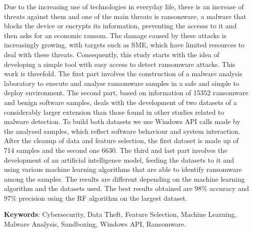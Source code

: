 \noindent Due to the increasing use of technologies in everyday life, there is an increase of threats against them and one of the main threats is ransomware, a malware that blocks the device or encrypts its information, preventing the accesss to it and then asks for an economic ransom. The damage caused by these attacks is increasingly growing, with targets such as \gls{SME}, which have limited resources to deal with these threats. Consequently, this study starts with the idea of developing a simple tool with easy access to detect ransomware attacks.
This work is threefold. The first part involves the construction of a malware analysis laboratory to execute and analyse ransomware samples in a safe and simple to deploy environment. The second part, based on information of 15352 ransomware and benign software samples, deals with the development of two datasets of a considerably larger extension than those found in other studies related to malware detection. To build both datasets we use Windows \gls{API} calls made by the analysed samples, which reflect software behaviour and system interaction. After the cleanup of data and feature selection, the first dataset is made up of 714 samples and the second one 6630. The third and last part involves the development of an artificial intelligence model, feeding the datasets to it and using various machine learning algorithms that are able to identify ransomware among the samples.
The results are different depending on the machine learning algorithm and the datasets used. The best results obtained are 98\% accuracy and 97\% precision using the \gls{RF} algorithm on the largest dataset.

\vspace{0.2cm}
\noindent \textbf{Keywords}: Cybersecurity, Data Theft, Feature Selection, Machine Learning, Malware Analysis, Sandboxing, Windows \gls{API}, Ransomware.



